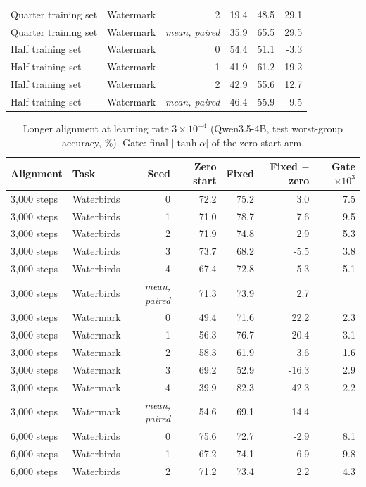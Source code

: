 \documentclass[10pt]{article}
\begin{document}
\begin{longtable}{llrrrr}
Quarter training set & Watermark & 2 & 19.4 & 48.5 & 29.1 \\
Quarter training set & Watermark & \textit{mean, paired} & 35.9 & 65.5 & 29.5 \\
Half training set & Watermark & 0 & 54.4 & 51.1 & -3.3 \\
Half training set & Watermark & 1 & 41.9 & 61.2 & 19.2 \\
Half training set & Watermark & 2 & 42.9 & 55.6 & 12.7 \\
Half training set & Watermark & \textit{mean, paired} & 46.4 & 55.9 & 9.5 \\
\bottomrule
\end{longtable}

\begin{longtable}{llrrrrr}
\caption{Longer alignment at learning rate $3\times10^{-4}$ (Qwen3.5-4B, test worst-group accuracy, \%). Gate: final $|\tanh\alpha|$ of the zero-start arm.}\label{tab:s-align}\\
\toprule
Alignment & Task & Seed & Zero start & Fixed & Fixed $-$ zero & Gate $\times 10^3$ \\ \midrule
\endhead
3,000 steps & Waterbirds & 0 & 72.2 & 75.2 & 3.0 & 7.5 \\
3,000 steps & Waterbirds & 1 & 71.0 & 78.7 & 7.6 & 9.5 \\
3,000 steps & Waterbirds & 2 & 71.9 & 74.8 & 2.9 & 5.3 \\
3,000 steps & Waterbirds & 3 & 73.7 & 68.2 & -5.5 & 3.8 \\
3,000 steps & Waterbirds & 4 & 67.4 & 72.8 & 5.3 & 5.1 \\
3,000 steps & Waterbirds & \textit{mean, paired} & 71.3 & 73.9 & 2.7 &  \\
3,000 steps & Watermark & 0 & 49.4 & 71.6 & 22.2 & 2.3 \\
3,000 steps & Watermark & 1 & 56.3 & 76.7 & 20.4 & 3.1 \\
3,000 steps & Watermark & 2 & 58.3 & 61.9 & 3.6 & 1.6 \\
3,000 steps & Watermark & 3 & 69.2 & 52.9 & -16.3 & 2.9 \\
3,000 steps & Watermark & 4 & 39.9 & 82.3 & 42.3 & 2.2 \\
3,000 steps & Watermark & \textit{mean, paired} & 54.6 & 69.1 & 14.4 &  \\
6,000 steps & Waterbirds & 0 & 75.6 & 72.7 & -2.9 & 8.1 \\
6,000 steps & Waterbirds & 1 & 67.2 & 74.1 & 6.9 & 9.8 \\
6,000 steps & Waterbirds & 2 & 71.2 & 73.4 & 2.2 & 4.3 \\

\end{longtable}
\end{document}
